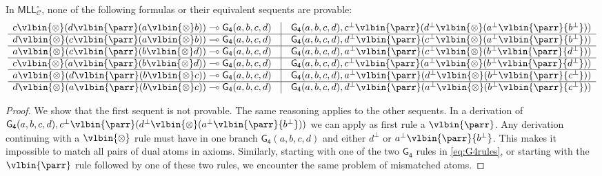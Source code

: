 \documentclass{lmcs} %
\def\limp{\multimap}
\def\cneg#1{{#1^\bot}}
\def\lpar{\vlbin{\parr}}
\def\ltens{\vlbin{\otimes}}
\def\MLL{\mathsf{MLL}}
\theoremstyle{plain}
\def\gcon{\mathsf{G_4}}
\def\MLLgen{\MLL^\circ_{\mathcal C}}
\begin{document}
\begin{prop}
In $\MLLgen$, none of the following formulas or their equivalent sequents are provable:
\begin{equation}
	\label{eq:non-provableMLLG}
\begin{array}{c@{\quad}|@{\quad }c}
c\ltens(d\lpar (a\ltens b))
\limp
\gcon(a,b,c,d)
&
\gcon(a,b,c,d),  \cneg c\lpar (\cneg d\ltens (\cneg a \lpar \cneg b))
\\	\hline
%
d\ltens(c\lpar (a\ltens b))
\limp
\gcon(a,b,c,d)
&
\gcon(a,b,c,d), \cneg d\lpar (\cneg c\ltens (\cneg a \lpar \cneg b))
\\	\hline
%
a\ltens(c\lpar (b\ltens d))
\limp
\gcon(a,b,c,d)
&
\gcon(a,b,c,d),  \cneg a\lpar (\cneg c\ltens (\cneg b \lpar \cneg d))
\\	\hline
c\ltens(a\lpar (b\ltens d))
\limp
\gcon(a,b,c,d)
&
\gcon(a,b,c,d),  \cneg c\lpar (\cneg a\ltens (\cneg b \lpar \cneg d))
\\	\hline
%
a\ltens(d\lpar (b\ltens c))
\limp
\gcon(a,b,c,d)
&
\gcon(a,b,c,d), \cneg a\lpar (\cneg d\ltens (\cneg b \lpar \cneg c))
\\	\hline
%
d\ltens(a\lpar (b\ltens c))
\limp
\gcon(a,b,c,d)
&
\gcon(a,b,c,d),  \cneg d \lpar (\cneg a\ltens (\cneg b \lpar \cneg c))
\end{array}
\end{equation}
\end{prop}
\begin{proof}
We show that the first sequent is not provable. The same reasoning applies to the other sequents.
In a derivation of $\gcon(a,b,c,d),  \cneg c\lpar (\cneg d\ltens (\cneg a \lpar \cneg b))$ we can apply as first rule a $\lpar$.
Any derivation continuing with a $\ltens$ rule must have in one branch $\gcon(a,b,c,d)$  and either $\cneg d$ or $\cneg a \lpar \cneg b$. This makes it impossible to match all pairs of dual atoms in axioms. 
Similarly,  starting with one of the two $\gcon$ rules in \ref{eq:G4rules}, 
or starting with the $\lpar$ rule followed by one of these two rules, 
we encounter the same problem
of mismatched  atoms. 
\end{proof}
\end{document}
